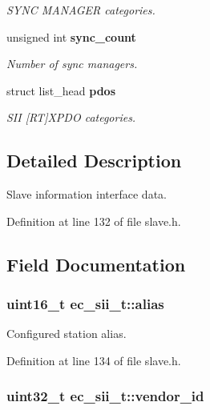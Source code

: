 \begin{DoxyCompactItemize}
$$\begin{DoxyCompactList}\small\item\em S\-Y\-N\-C M\-A\-N\-A\-G\-E\-R categories. \end{DoxyCompactList}\item 
unsigned int {\bf sync\-\_\-count}
\begin{DoxyCompactList}\small\item\em Number of sync managers. \end{DoxyCompactList}\item 
struct list\-\_\-head {\bf pdos}
\begin{DoxyCompactList}\small\item\em S\-I\-I [R\-T]X\-P\-D\-O categories. \end{DoxyCompactList}\end{DoxyCompactItemize}


\subsection{Detailed Description}
Slave information interface data. 

Definition at line 132 of file slave.\-h.



\subsection{Field Documentation}
\subsubsection[{alias}]{\setlength{\rightskip}{0pt plus 5cm}uint16\-\_\-t ec\-\_\-sii\-\_\-t\-::alias}\label{structec__sii__t_a1f222ffbedb48380a833e94fe9a08a8b}


Configured station alias. 



Definition at line 134 of file slave.\-h.

\subsubsection[{vendor\-\_\-id}]{\setlength{\rightskip}{0pt plus 5cm}uint32\-\_\-t ec\-\_\-sii\-\_\-t\-::vendor\-\_\-id}\label{structec__sii__t_ad185baf2f7711424507c20f6e96b7014}


